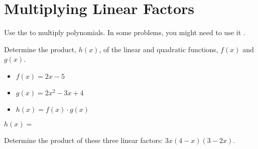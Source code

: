 \section{Multiplying Linear Factors}



Use the   to multiply polynomials.
In some problems, you might need to use it .

\vspace{-0.5em}
\myProblemsWithContent
{
    Determine the product, $h(x)$, 
    of the linear and quadratic functions, $f(x)$ and $g(x)$.
    \begin{itemize}[nosep]
        \item $f(x) = 2x-5$
        \item $g(x) = 2x^2 - 3x + 4$
        \item $h(x) = f(x) \cdot g(x)$
    \end{itemize}
    \tcblower
    \vspace{1.5in}
    $h(x) =$ 
}
{
    Determine the product of these three linear factors:
    $3x(4-x)(3-2x)$.
    \tcblower 
}

